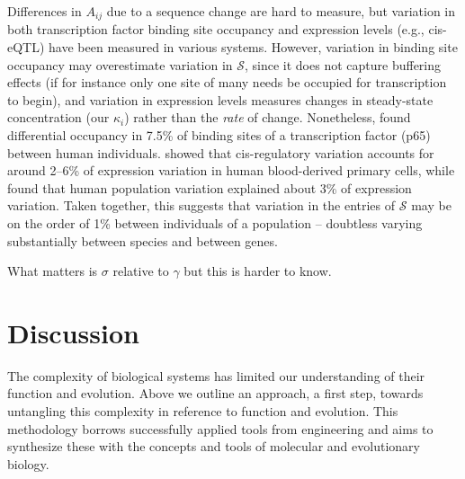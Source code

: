 \documentclass{article}
\newcommand{\plr}[1]{\todo[color=blue!25]{#1}}
\newcommand{\plr}[1]{{\color{blue}\it #1}}
\newcommand{\1}{\mathbbm{1}}
\newcommand{\Sys}{\mathcal{S}}
\begin{document}
Differences in $A_{ij}$ due to a sequence change are hard to measure,
but variation in both transcription factor binding site occupancy
and expression levels (e.g., cis-eQTL) have been measured in various systems.
However, variation in binding site occupancy may overestimate variation in $\Sys$,
since it does not capture buffering effects (if for instance only one site of many needs be occupied for transcription to begin),
and variation in expression levels measures changes in steady-state concentration (our $\kappa_i$) rather than the \emph{rate} of change.
Nonetheless,
\citet{kasowski2010variation} found differential occupancy in 7.5\%
of binding sites of a transcription factor (p65) between human individuals.
\citet{verlaan2009targeted} showed that cis-regulatory variation
accounts for around 2--6\% of expression variation in human blood-derived primary cells,
while \citep{lappalainen2013transcriptome} found that human population variation 
explained about 3\% of expression variation.
Taken together, this suggests that variation in the entries of $\Sys$
may be on the order of 1\% between individuals of a population --
doubtless varying substantially between species and between genes.

What matters is $\sigma$ relative to $\gamma$ but this is harder to know.


\section*{Discussion}


The complexity of biological systems has limited our understanding of their function and evolution. Above we outline an approach, a first step, towards untangling this complexity in reference to function and evolution. This methodology borrows successfully applied tools from engineering and aims to synthesize these with the concepts and tools of molecular and evolutionary biology. 
\end{document}
